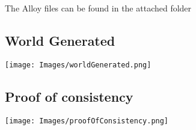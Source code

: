The Alloy files can be found in the attached folder


\subsection{World Generated}
\centering
\texttt{[image: Images/worldGenerated.png]}\\
\subsection{Proof of consistency}
\centering
\texttt{[image: Images/proofOfConsistency.png]}\\
